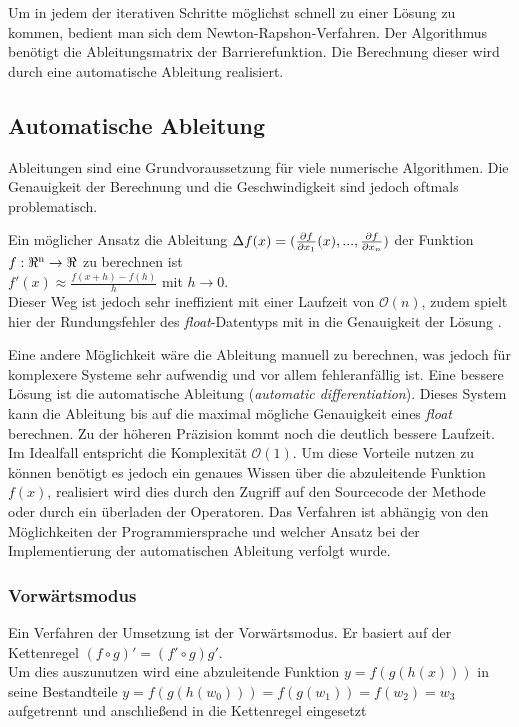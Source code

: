 \documentclass{like}
\begin{document}
Um in jedem der iterativen Schritte möglichst schnell zu einer Lösung zu kommen, bedient man sich dem Newton-Rapshon-Verfahren. 
Der Algorithmus benötigt die Ableitungsmatrix der Barrierefunktion. Die Berechnung dieser wird durch eine automatische Ableitung realisiert.

\subsection{Automatische Ableitung} 

Ableitungen sind eine Grundvoraussetzung für viele numerische Algorithmen. Die Genauigkeit der Berechnung und die Geschwindigkeit sind jedoch oftmals problematisch.

Ein möglicher Ansatz die Ableitung $\Delta{\tiny } f(x) = (\frac{\partial f}{\partial x_1} (x), ..., \frac{\partial f}{\partial x_n})$ der Funktion $f:\Re \textsuperscript{n} \rightarrow \Re $ zu berechnen ist \\
$f'(x) \approx \frac{f(x+h) - f(h)}{h}$ mit $ h \rightarrow 0 $. \\
Dieser Weg ist jedoch sehr ineffizient mit einer Laufzeit von $\mathcal{O}(n)$, zudem spielt hier der Rundungsfehler des \textit{float}-Datentyps mit in die Genauigkeit der Lösung \cite{julDiff}.

Eine andere Möglichkeit wäre die Ableitung manuell zu berechnen, was jedoch für komplexere Systeme sehr aufwendig und vor allem fehleranfällig ist. Eine bessere Lösung ist die automatische Ableitung (\emph{automatic differentiation}). 
Dieses System kann die Ableitung bis auf die maximal mögliche Genauigkeit eines \textit{float} berechnen. Zu der höheren Präzision kommt noch die deutlich bessere Laufzeit. Im Idealfall entspricht die Komplexität $\mathcal{O}(1)$. Um diese Vorteile nutzen zu können benötigt es jedoch ein genaues Wissen über die abzuleitende Funktion \(f(x)\), realisiert wird dies durch den Zugriff auf den Sourcecode der Methode oder durch ein überladen der Operatoren. Das Verfahren ist abhängig von den Möglichkeiten der Programmiersprache und welcher Ansatz bei der Implementierung der automatischen Ableitung verfolgt wurde. 


\subsubsection*{Vorwärtsmodus}
Ein Verfahren der Umsetzung ist der Vorwärtsmodus. Er basiert auf der Kettenregel $(f \circ g)' = (f' \circ g)g'$. \\
Um dies auszunutzen wird eine abzuleitende Funktion $ y = f(g(h(x)))$ in seine Bestandteile $y = f(g(h(w_0))) = f(g(w_1)) = f(w_2) = w_3$ aufgetrennt und anschließend in die Kettenregel eingesetzt 
\end{document}
